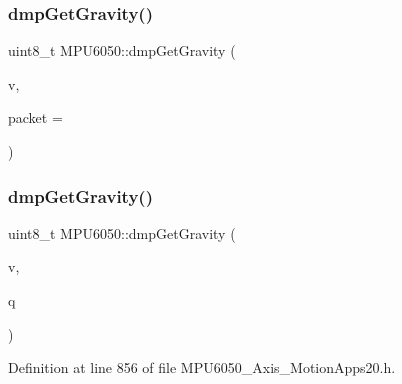 \subsubsection{\texorpdfstring{dmpGetGravity()}{dmpGetGravity()}\hspace{0.1cm}{\footnotesize\ttfamily [3/4]}}
{\footnotesize\ttfamily uint8\+\_\+t M\+P\+U6050\+::dmp\+Get\+Gravity (\begin{DoxyParamCaption}\item[{\mbox{\hyperlink{classVectorInt16}{Vector\+Int16}} $\ast$}]{v,  }\item[{const uint8\+\_\+t $\ast$}]{packet = {} }\end{DoxyParamCaption})}

\mbox{\label{classMPU6050_aa061914109ac5a74ad93c26c903abdd4}} 
\subsubsection{\texorpdfstring{dmpGetGravity()}{dmpGetGravity()}\hspace{0.1cm}{\footnotesize\ttfamily [4/4]}}
{\footnotesize\ttfamily uint8\+\_\+t M\+P\+U6050\+::dmp\+Get\+Gravity (\begin{DoxyParamCaption}\item[{\mbox{\hyperlink{classVectorFloat}{Vector\+Float}} $\ast$}]{v,  }\item[{\mbox{\hyperlink{classQuaternion}{Quaternion}} $\ast$}]{q }\end{DoxyParamCaption})}



Definition at line 856 of file M\+P\+U6050\+\_\+Axis\+\_\+\+Motion\+Apps20.\+h.


